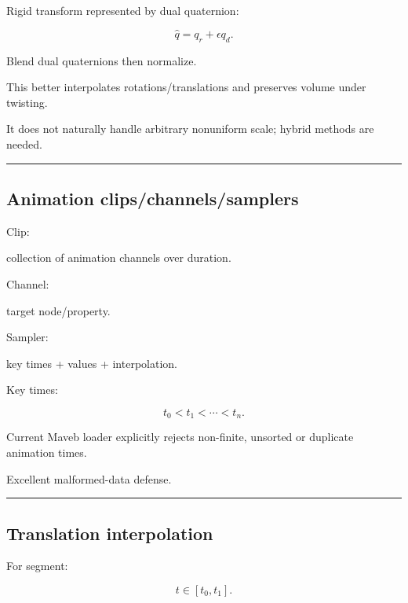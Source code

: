 \hypertarget{04-visual-computing-ii-ch041-dual-quaternion-skinning}{}

Rigid transform represented by dual quaternion:

\[
\hat q=
q_r+
\epsilon q_d.
\]

Blend dual quaternions then normalize.

This better interpolates rotations/translations and preserves volume under twisting.

It does not naturally handle arbitrary nonuniform scale; hybrid methods are needed.

\begin{center}\rule{0.5\linewidth}{0.5pt}\end{center}

\subsection{Animation clips/channels/samplers}\label{04-visual-computing-ii-ch041-animation-clipschannelssamplers}

\hypertarget{04-visual-computing-ii-ch041-animation-clipschannelssamplers}{}

Clip:

collection of animation channels over duration.

Channel:

target node/property.

Sampler:

key times + values + interpolation.

Key times:

\[
t_0<t_1<\cdots<t_n.
\]

Current Maveb loader explicitly rejects non-finite, unsorted or duplicate animation times.

Excellent malformed-data defense.

\begin{center}\rule{0.5\linewidth}{0.5pt}\end{center}

\subsection{Translation interpolation}\label{04-visual-computing-ii-ch041-translation-interpolation}

\hypertarget{04-visual-computing-ii-ch041-translation-interpolation}{}

For segment:

\[
t\in[t_0,t_1].
\]

